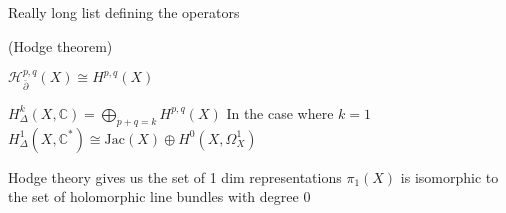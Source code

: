 Really long list defining the operators 

\begin{theorem}
    (Hodge theorem) 
\end{theorem}

\begin{theorem}
    $ \mathcal{H} ^{p,q} _{\bar{\partial} } (X) \cong H^{p,q} (X) $ 
\end{theorem}

\begin{theorem}
    $H^k _{\Delta } ( X, \mathbb{C} ) = \bigoplus _{p+q = k }  H^{p,q} ( X) $
    In the case where $ k = 1 $
    $H^1 _\Delta ( X, \mathbb{C}  ^* ) \cong \mathrm{Jac} (X) \oplus H^0 ( X, \Omega_X ^ 1) $
\end{theorem}


Hodge theory gives us the set of 1 dim representations $\pi_1(X) $ is isomorphic to the set of holomorphic line bundles with degree 0 







 

